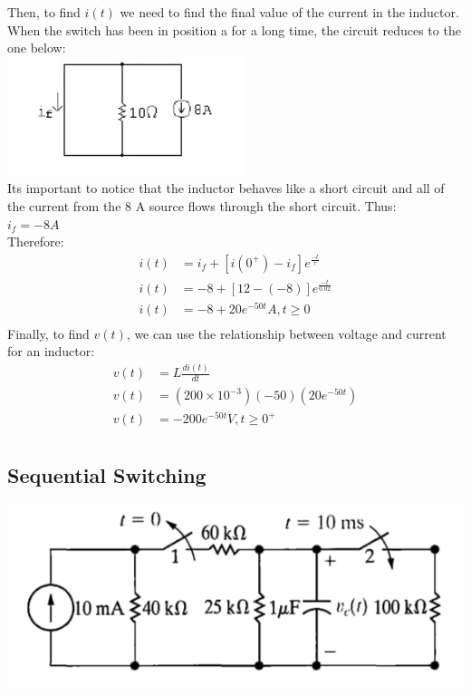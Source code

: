 Then, to find $i(t)$ we need to find the final value of the current in the
inductor. When the switch has been in position a for a long time, the circuit
reduces to the one below:\\
\includegraphics{img/c7/a3}\\
Its important to notice that the inductor behaves like a short circuit and all
of the current from the 8 A source flows through the short circuit. Thus: \\
$ i_f = -8 A $ \\
Therefore:
\begin{align*}
	i(t) &= i_f + [i(0^{+}) - i_f]e^{\frac{-t}{\tau}} \\
	i(t) &= -8 + [12 - (-8)]e^{\frac{-t}{0.02}} \\
	i(t) &= -8 + 20e^{-50t} A, t \geq 0 \\
\end{align*}
Finally, to find $v(t)$, we can use the relationship between voltage and 
current for an inductor:
\begin{align*}
	v(t) &= L\frac{di(t)}{dt} \\
	v(t) &= (200 \times 10^{-3})(-50)(20e^{-50t}) \\
	v(t) &= -200e^{-50t} V, t \geq 0^{+} \\
\end{align*}



\subsection{Sequential Switching}
\includegraphics[scale=0.5]{img/c7/p2}

